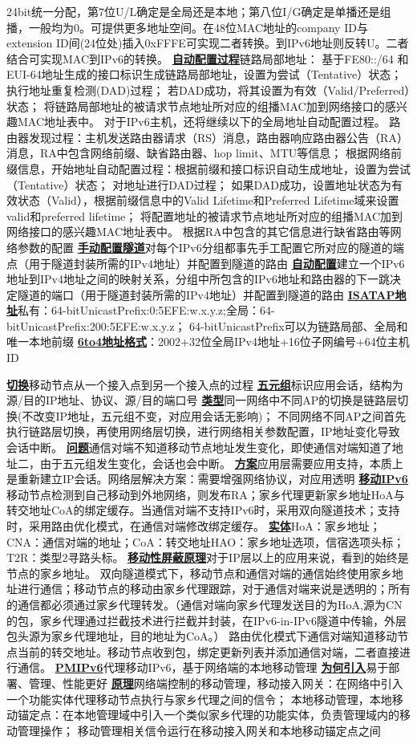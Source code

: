 \documentclass[twocolumn]{ctexart}
\renewcommand{\emph}[1]{\textbf{\underline{#1}}}
\begin{document}
24bit统一分配，第7位U/L确定是全局还是本地；第八位I/G确定是单播还是组播，一般均为0。可提供更多地址空间。在48位MAC地址的company ID与extension ID间(24位处)插入0xFFFE可实现二者转换。到IPv6地址则反转U。二者结合可实现MAC到IPv6的转换。
\emph{自动配置过程}链路局部地址：
基于FE80::/64 和 EUI-64地址生成的接口标识生成链路局部地址，设置为尝试（Tentative）状态；
执行地址重复检测(DAD)过程；
若DAD成功，将其设置为有效（Valid/Preferred）状态；
将链路局部地址的被请求节点地址所对应的组播MAC加到网络接口的感兴趣MAC地址表中。
对于IPv6主机，还将继续以下的全局地址自动配置过程。
路由器发现过程：主机发送路由器请求（RS）消息，路由器响应路由器公告（RA）消息，RA中包含网络前缀、缺省路由器、hop limit、MTU等信息；
根据网络前缀信息，开始地址自动配置过程：根据前缀和接口标识自动生成地址，设置为尝试（Tentative）状态；
对地址进行DAD过程；
如果DAD成功，设置地址状态为有效状态（Valid），根据前缀信息中的Valid Lifetime和Preferred Lifetime域来设置valid和preferred lifetime；
将配置地址的被请求节点地址所对应的组播MAC加到网络接口的感兴趣MAC地址表中。
根据RA中包含的其它信息进行缺省路由等网络参数的配置
\emph{手动配置隧道}对每个IPv6分组都事先手工配置它所对应的隧道的端点（用于隧道封装所需的IPv4地址）并配置到隧道的路由
\emph{自动配置}建立一个IPv6地址到IPv4地址之间的映射关系，分组中所包含的IPv6地址和路由器的下一跳决定隧道的端口（用于隧道封装所需的IPv4地址）并配置到隧道的路由
\emph{ISATAP地址}私有：64-bitUnicastPrefix:0:5EFE:w.x.y.z;全局：64-bitUnicastPrefix:200:5EFE:w.x.y.z；
64-bitUnicastPrefix可以为链路局部、全局和唯一本地前缀
\emph{6to4地址格式}：2002+32位全局IPv4地址+16位子网编号+64位主机ID

\emph{切换}移动节点从一个接入点到另一个接入点的过程
\emph{五元组}标识应用会话，结构为源/目的IP地址、协议、源/目的端口号
\emph{类型}同一网络中不同AP的切换是链路层切换(不改变IP地址，五元组不变，对应用会话无影响)；
不同网络不同AP之间首先执行链路层切换，再使用网络层切换，进行网络相关参数配置，IP地址变化导致会话中断。
\emph{问题}通信对端不知道移动节点地址发生变化，即使通信对端知道了地址二，由于五元组发生变化，会话也会中断。
\emph{方案}应用层需要应用支持，本质上是重新建立IP会话。网络层解决方案：需要增强网络协议，对应用透明
\emph{移动IPv6}移动节点检测到自己移动到外地网络，则发布RA；家乡代理更新家乡地址HoA与转交地址CoA的绑定缓存。当通信对端不支持IPv6时，采用双向隧道技术；支持时，采用路由优化模式，在通信对端修改绑定缓存。
\emph{实体}HoA：家乡地址；CNA：通信对端的地址；CoA：转交地址HAO：家乡地址选项，信宿选项头标；T2R：类型2寻路头标。
\emph{移动性屏蔽原理}对于IP层以上的应用来说，看到的始终是节点的家乡地址。
双向隧道模式下，移动节点和通信对端的通信始终使用家乡地址进行通信；移动节点的移动由家乡代理跟踪，对于通信对端来说是透明的；所有的通信都必须通过家乡代理转发。（通信对端向家乡代理发送目的为HoA,源为CN的包，家乡代理通过拦截技术进行拦截并封装，在IPv6-in-IPv6隧道中传输，外层包头源为家乡代理地址，目的地址为CoA。）
路由优化模式下通信对端知道移动节点当前的转交地址。移动节点收到包，绑定更新列表并添加通信对端，二者直接进行通信。
\emph{PMIPv6}代理移动IPv6，基于网络端的本地移动管理
\emph{为何引入}易于部署、管理、性能更好
\emph{原理}网络端控制的移动管理，移动接入网关：在网络中引入一个功能实体代理移动节点执行与家乡代理之间的信令；
本地移动管理，本地移动锚定点：在本地管理域中引入一个类似家乡代理的功能实体，负责管理域内的移动管理操作；
移动管理相关信令运行在移动接入网关和本地移动锚定点之间
\end{document}
